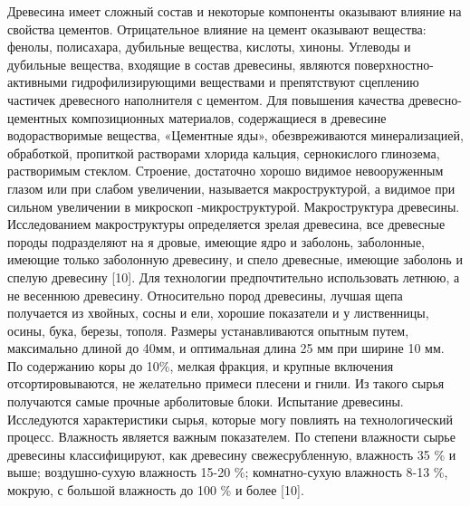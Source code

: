 \begin{multicols}{2}
Древесина имеет сложный состав и некоторые компоненты оказывают влияние
на свойства цементов. Отрицательное влияние на цемент оказывают
вещества: фенолы, полисахара, дубильные вещества, кислоты, хиноны.
Углеводы и дубильные вещества, входящие в состав древесины, являются
поверхностно-активными гидрофилизирующими веществами и препятствуют
сцеплению частичек древесного наполнителя с цементом. Для повышения
качества древесно-цементных композиционных материалов, содержащиеся в
древесине водорастворимые вещества, «Цементные яды», обезвреживаются
минерализацией, обработкой, пропиткой растворами хлорида кальция,
сернокислого глинозема, растворимым стеклом. Строение, достаточно хорошо
видимое невооруженным глазом или при слабом увеличении, называется
макроструктурой, а видимое при сильном увеличении в микроскоп
-микроструктурой. Макроструктура древесины. Исследованием макроструктуры
определяется зрелая древесина, все древесные породы подразделяют на я
дровые, имеющие ядро и заболонь, заболонные, имеющие только заболонную
древесину, и спело древесные, имеющие заболонь и спелую древесину
{[}10{]}. Для технологии предпочтительно использовать летнюю, а не
весеннюю древесину. Относительно пород древесины, лучшая щепа получается
из хвойных, сосны и ели, хорошие показатели и у лиственницы, осины,
бука, березы, тополя. Размеры устанавливаются опытным путем, максимально
длиной до 40мм, и оптимальная длина 25 мм при ширине 10 мм. По
содержанию коры до 10\%, мелкая фракция, и крупные включения
отсортировываются, не желательно примеси плесени и гнили. Из такого
сырья получаются самые прочные арболитовые блоки. Испытание древесины.
Исследуются характеристики сырья, которые могу повлиять на
технологический процесс. Влажность является важным показателем. По
степени влажности сырье древесины классифицируют, как древесину
свежесрубленную, влажность 35 \% и выше; воздушно-сухую влажность 15-20
\%; комнатно-сухую влажность 8-13 \%, мокрую, с большой влажность до 100
\% и более {[}10{]}.


\end{multicols}
